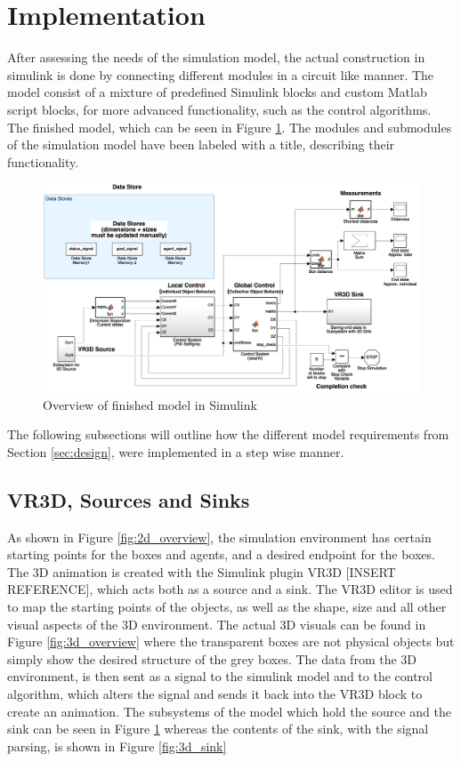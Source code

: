 \section{Implementation}
\label{sec:construction}

After assessing the needs of the simulation model, the actual construction in simulink is done by connecting different modules in a circuit like manner. The model consist of a mixture of predefined Simulink blocks and custom Matlab script blocks, for more advanced functionality, such as the control algorithms. The finished model, which can be seen in Figure \ref{fig:model_overview}. The modules and submodules of the simulation model have been labeled with a title, describing their functionality.

\begin{figure}[H]
	\centering
	\includegraphics[width=1\columnwidth]{figures/model_overview}
  	\caption{\label{fig:model_overview}Overview of finished model in Simulink}
\end{figure}

The following subsections will outline how the different model requirements from Section \ref{sec:design}, were implemented in a step wise manner.

\subsection{VR3D, Sources and Sinks}
As shown in Figure \ref{fig:2d_overview}, the simulation environment has certain starting points for the boxes and agents, and a desired endpoint for the boxes. The 3D animation is created with the Simulink plugin VR3D [INSERT REFERENCE], which acts both as a source and a sink. The VR3D editor is used to map the starting points of the objects, as well as the shape, size and all other visual aspects of the 3D environment. The actual 3D visuals can be found in Figure \ref{fig:3d_overview} where the transparent boxes are not physical objects but simply show the desired structure of the grey boxes. The data from the 3D environment, is then sent as a signal to the simulink model and to the control algorithm, which alters the signal and sends it back into the VR3D block to create an animation. The subsystems of the model which hold the source and the sink can be seen in Figure \ref{fig:model_overview} whereas the contents of the sink, with the signal parsing, is shown in Figure \ref{fig:3d_sink}

